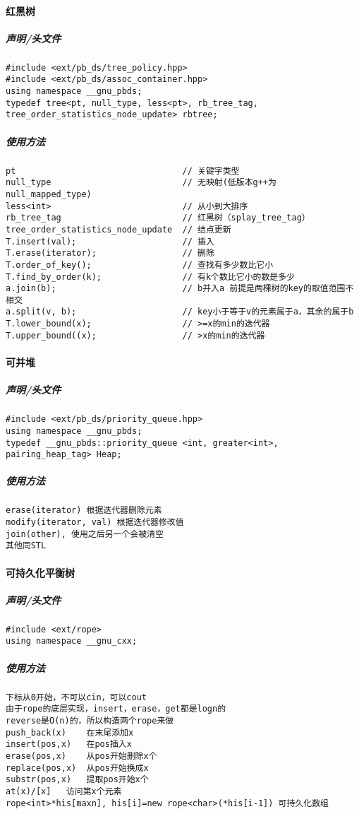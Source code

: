 \paragraph{红黑树}
\subparagraph{声明/头文件}
\begin{lstlisting}
#include <ext/pb_ds/tree_policy.hpp>
#include <ext/pb_ds/assoc_container.hpp>
using namespace __gnu_pbds;
typedef tree<pt, null_type, less<pt>, rb_tree_tag, tree_order_statistics_node_update> rbtree;
\end{lstlisting}
\subparagraph{使用方法}
\begin{lstlisting}
pt                                 // 关键字类型
null_type                          // 无映射(低版本g++为null_mapped_type)
less<int>                          // 从小到大排序
rb_tree_tag                        // 红黑树（splay_tree_tag）
tree_order_statistics_node_update  // 结点更新
T.insert(val);                     // 插入
T.erase(iterator);                 // 删除
T.order_of_key();                  // 查找有多少数比它小
T.find_by_order(k);                // 有k个数比它小的数是多少
a.join(b);                         // b并入a 前提是两棵树的key的取值范围不相交
a.split(v, b);                     // key小于等于v的元素属于a，其余的属于b
T.lower_bound(x);                  // >=x的min的迭代器
T.upper_bound((x);                 // >x的min的迭代器
\end{lstlisting}
\paragraph{可并堆}
\subparagraph{声明/头文件}
\begin{lstlisting}
#include <ext/pb_ds/priority_queue.hpp>
using namespace __gnu_pbds;
typedef __gnu_pbds::priority_queue <int, greater<int>, pairing_heap_tag> Heap;
\end{lstlisting}
\subparagraph{使用方法}
\begin{lstlisting}
erase(iterator) 根据迭代器删除元素
modify(iterator, val) 根据迭代器修改值
join(other), 使用之后另一个会被清空
其他同STL
\end{lstlisting}
\paragraph{可持久化平衡树}
\subparagraph{声明/头文件}
\begin{lstlisting}
#include <ext/rope>
using namespace __gnu_cxx;
\end{lstlisting}
\subparagraph{使用方法}
\begin{lstlisting}
下标从0开始，不可以cin，可以cout
由于rope的底层实现，insert，erase，get都是logn的
reverse是O(n)的，所以构造两个rope来做
push_back(x)    在末尾添加x
insert(pos,x)   在pos插入x
erase(pos,x)    从pos开始删除x个
replace(pos,x)  从pos开始换成x
substr(pos,x)   提取pos开始x个
at(x)/[x]   访问第x个元素
rope<int>*his[maxn], his[i]=new rope<char>(*his[i-1]) 可持久化数组
\end{lstlisting}